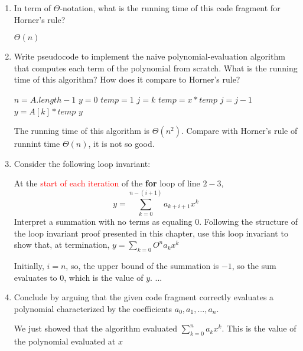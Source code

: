 \documentclass[a4paper, 11pt, UTF8]{article}
\begin{document}
\begin{enumerate}
    \item In term of $\Theta$-notation, what is the running time of this code
        fragment for Horner's rule?

        $\Theta(n)$ 

    \item Write pseudocode to implement the naive polynomial-evaluation 
        algorithm that computes each term of the polynomial from scratch. What
        is the running time of this algorithm? How does it compare to Horner's
        rule?

        \begin{algorithm}
        \begin{algorithmic}
            \State $n = A.length - 1$ 
            \State $y = 0$ 
                \State $temp = 1$
                \State  $j = k$
                    \State $temp = x * temp$
                    \State  $j = j - 1$
                \EndWhile
                \State $y = A[k] * temp$
            \EndFor
            \State \Return $y$
            \EndFunction
        \end{algorithmic}
        \end{algorithm}

        The running time of this algorithm is $\Theta(n^2)$. Compare with 
        Horner's  rule of runnint time $\Theta(n)$, it is not so good.
    \item Consider the following loop invariant:

        At the \textcolor{red}{start of each iteration} of the \textbf{for} loop of line
        $2-3$,
        \[
            y = \sum\limits_{k = 0}^{n - (i+1)} a_{k+i+1} x^k
        \]
        Interpret a summation with no terms as equaling 0. Following the 
        structure of the loop invariant proof presented in this chapter, use 
        this loop invariant to show that, at termination, $y = \sum_{k = 0}O^n a_k x^k$ 

        Initially, $i=n$, so, the upper bound of the summation is $-1$, so the
        sum evaluates to 0, which is the value of $y$. ...

    \item Conclude by arguing that the given code fragment correctly evaluates
        a polynomial characterized by the coefficients $a_0, a_1, \dots, a_n$.

        We just showed that the algorithm evaluated $\sum_{k=0}^n a_k x^k$. This
        is the value of the polynomial evaluated at $x$
\end{enumerate}
\end{document}
